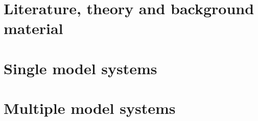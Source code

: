 \documentclass[11pt,fleqn]{report}
\theoremstyle{defstyle}
\begin{document}
\graphicspath{{./imgs/}{../imgs/}} %



\part{Literature, theory and background material}
\label{part_one}




\part{Single model systems} 
\label{part_two}

 

\part{Multiple model systems} 
\label{part_three} 






\newpage


\end{document}

